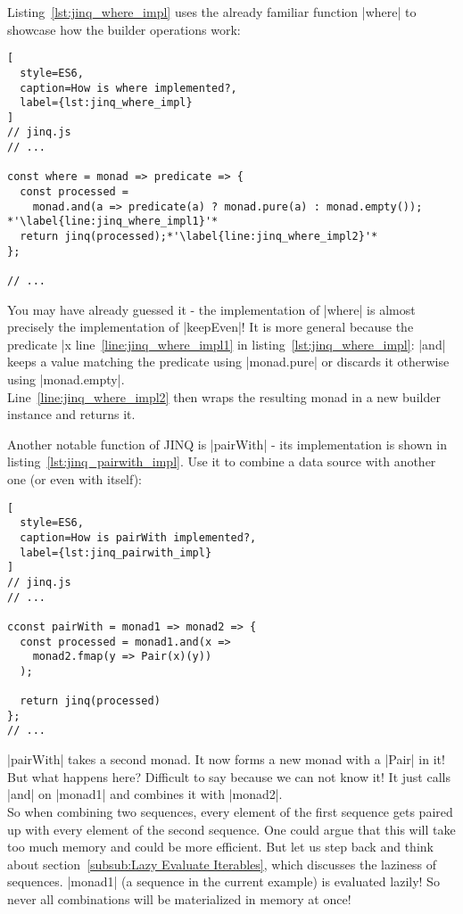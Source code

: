 Listing~\ref{lst:jinq_where_impl} uses the already familiar function |where| to
showcase how the builder operations work:

\begin{lstlisting}[
  style=ES6,
  caption=How is where implemented?,
  label={lst:jinq_where_impl}
]
// jinq.js
// ...

const where = monad => predicate => {
  const processed = 
    monad.and(a => predicate(a) ? monad.pure(a) : monad.empty()); *'\label{line:jinq_where_impl1}'*
  return jinq(processed);*'\label{line:jinq_where_impl2}'*
};

// ...
\end{lstlisting}

You may have already guessed it - the implementation of |where| is almost
precisely the implementation of |keepEven|! It is more general because the
predicate |x %
line~\ref{line:jinq_where_impl1} in listing~\ref{lst:jinq_where_impl}: |and|
keeps a value matching the predicate using |monad.pure| or discards it
otherwise using |monad.empty|.\\
Line~\ref{line:jinq_where_impl2} then wraps the resulting monad in a new
builder instance and returns it.

Another notable function of JINQ is |pairWith| - its implementation is shown in
listing~\ref{lst:jinq_pairwith_impl}. Use it to combine a data source with
another one (or even with itself):

\begin{lstlisting}[
  style=ES6,
  caption=How is pairWith implemented?,
  label={lst:jinq_pairwith_impl}
]
// jinq.js
// ...

cconst pairWith = monad1 => monad2 => {
  const processed = monad1.and(x =>
    monad2.fmap(y => Pair(x)(y))
  );

  return jinq(processed)
};
// ...
\end{lstlisting}

|pairWith| takes a second monad. It now forms a new monad with a |Pair| in it!
But what happens here? Difficult to say because we can not know it! It just
calls |and| on |monad1| and combines it with |monad2|. \\
So when combining two sequences, every element of the first sequence gets
paired up with every element of the second sequence. One could argue that this
will take too much memory and could be more efficient. But let us step back and
think about section~\ref{subsub:Lazy Evaluate Iterables}, which discusses the laziness of sequences. |monad1|
(a sequence in the current example) is evaluated lazily! So never all
combinations will be materialized in memory at once!

